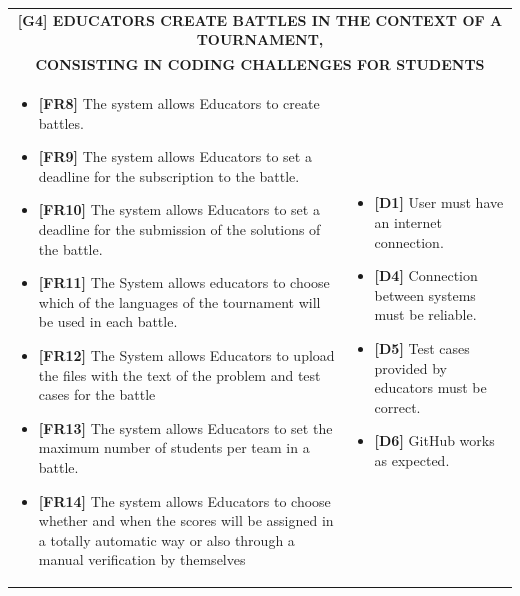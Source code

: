 \documentclass{article}
\begin{document}
\begin{table}
\begin{adjustwidth}{-1in}{-1in}
 \renewcommand{\arraystretch}{1.5}
    \begin{tabular}{|p{9.5cm}|p{9.5cm}|}
        \hline
        \multicolumn{2}{|c|}{\textbf{[G4] EDUCATORS CREATE BATTLES IN THE CONTEXT OF A TOURNAMENT,}} \\
        \multicolumn{2}{|c|}{\textbf{CONSISTING IN CODING CHALLENGES FOR STUDENTS}} \\
        \hline
        \begin{itemize}[label={}, left=0pt, align=left, itemsep=5pt]
            \item \textbf{[FR8]} The system allows Educators to create battles.
            \item \textbf{[FR9]} The system allows Educators to set a deadline for the subscription to the battle.
            \item \textbf{[FR10]} The system allows Educators to set a deadline for the submission of the solutions of the battle.
            \item \textbf{[FR11]} The System allows educators to choose which of the languages of the tournament will be used in each battle.
            \item \textbf{[FR12]} The System allows Educators to upload the files with the text of the problem and test cases for the battle
            \item \textbf{[FR13]} The system allows Educators to set the maximum number of students per team in a battle.
            \item \textbf{[FR14]} The system allows Educators to choose whether and when the scores will be assigned in a totally automatic way or also through a manual verification by themselves
        \end{itemize} &
        \begin{itemize}[label={}, left=0pt, align=left, itemsep=5pt]
            \item \textbf{[D1]} User must have an internet connection.
            \item \textbf{[D4]} Connection between systems must be reliable.
            \item \textbf{[D5]} Test cases provided by educators must be correct.
            \item \textbf{[D6]} GitHub works as expected.
        \end{itemize} \\
        \hline
    \end{tabular}
\end{adjustwidth}
\end{table}
\end{document}
